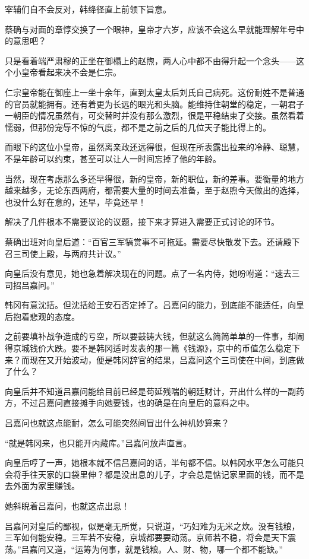 宰辅们自不会反对，韩绛径直上前领下旨意。

蔡确与对面的章惇交换了一个眼神，皇帝才六岁，应该不会这么早就能理解年号中的意思吧？

只是看着端严肃穆的正坐在御榻上的赵煦，两人心中都不由得升起一个念头——这个小皇帝看起来决不会是仁宗。

仁宗皇帝能在御座上一坐十余年，直到太皇太后刘氏自己病死。这份耐姓不是普通的官员就能拥有。还有着更为长远的眼光和头脑。能维持住朝堂的稳定，一朝君子一朝臣的情况虽然有，可交替时并没有那么激烈，很是平稳结束了交接。虽然看着懦弱，但那份宠辱不惊的气度，都不是之前之后的几位天子能比得上的。

而眼下的这位小皇帝，虽然离亲政还远得很，但现在所表露出拉来的冷静、聪慧，不是年龄可以约束，甚至可以让人一时间忘掉了他的年龄。

当然，现在考虑那么多还早得很，新的皇帝，新的职位，新的差事。要衡量的地方越来越多，无论东西两府，都需要大量的时间去准备，至于赵煦今天做出的选择，也没什么好在意的，还早，毕竟还早！

解决了几件根本不需要议论的议题，接下来才算进入需要正式讨论的环节。

蔡确出班对向皇后道：“百官三军犒赏事不可拖延。需要尽快散发下去。还请殿下召三司使上殿，与两府共计议。”

向皇后没有意见，她也急着解决现在的问题。点了一名内侍，她吩咐道：“速去三司招吕嘉问。”

韩冈有意沈括。但沈括给王安石否定掉了。吕嘉问的能力，到底能不能适任，向皇后抱着悲观的态度。

之前要填补战争造成的亏空，所以要鼓铸大钱，但就这么简简单单的一件事，却闹得京城钱价大跌。要不是韩冈适时发表的那一篇《钱源》，京中的币值怎么稳定下来？而现在又开始波动，便是韩冈辞官的结果，吕嘉问这个三司使在中间，到底做了什么？

向皇后并不知道吕嘉问能给目前已经是苟延残喘的朝廷财计，开出什么样的一副药方，不过吕嘉问直接摊手向她要钱，也的确是在向皇后的意料之中。

吕嘉问也就这点能耐，怎么可能突然间冒出什么神机妙算来？

“就是韩冈来，也只能开内藏库。”吕嘉问放声直言。

向皇后哼了一声，她根本就不信吕嘉问的话，半句都不信。以韩冈水平怎么可能只会将手往天家的口袋里伸？都是没出息的儿子，才会总是惦记家里面的钱，而不是去外面为家里赚钱。

她斜睨着吕嘉问，也就这点出息！

吕嘉问对皇后的鄙视，似是毫无所觉，只说道，“巧妇难为无米之炊。没有钱粮，三军如何能安稳。三军若不安稳，京城都要要动荡。京师若不稳，将会是天下震荡。”吕嘉问又道，“运筹为何事，就是钱粮。人、财、物，哪一个都不能缺。”

